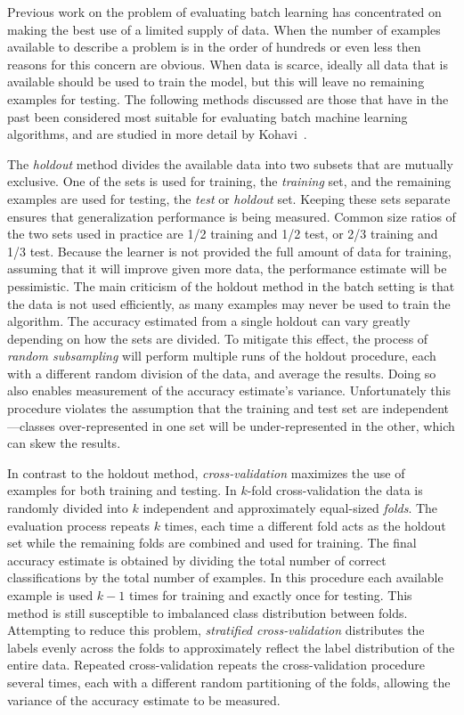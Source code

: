 Previous work on the problem of evaluating batch learning has concentrated on making the best use of a limited supply of data.
When the number of examples available to describe a problem is in the order of hundreds or even less then reasons for this concern are obvious. When data is scarce, ideally all data that is available should be used to train the model, but this will leave no remaining examples for testing. The following methods discussed are those that have in the past been considered most suitable for evaluating batch machine learning algorithms, and are studied in more detail by Kohavi~\cite{cvstudy}.


The {\em holdout} method divides the available data into two subsets that are mutually exclusive. One of the sets is used for training, the {\em training} set, and the remaining examples are used for testing, the {\em test} or {\em holdout} set. Keeping these sets separate ensures that generalization performance is being measured. Common size ratios of the two sets used in practice are 1/2 training and 1/2 test, or 2/3 training and 1/3 test. Because the learner is not provided the full amount of data for training, assuming that it will improve given more data, the performance estimate will be pessimistic. The main criticism of the holdout method in the batch setting is that the data is not used efficiently, as many examples may never be used to train the algorithm. The accuracy estimated from a single holdout can vary greatly depending on how the sets are divided. To mitigate this effect, the process of {\em random subsampling} will perform multiple runs of the holdout procedure, each with a different random division of the data, and average the results. Doing so also enables measurement of the accuracy estimate's variance. Unfortunately this procedure violates the assumption that the training and test set are independent---classes over-represented in one set will be under-represented in the other, which can skew the results. 


In contrast to the holdout method, {\em cross-validation} maximizes the use of examples for both training and testing. In $k$-fold cross-validation the data is randomly divided into $k$ independent and approximately equal-sized {\em folds}. The evaluation process repeats $k$ times, each time a different fold acts as the holdout set while the remaining folds are combined and used for training. The final accuracy estimate is obtained by dividing the total number of correct classifications by the total number of examples. In this procedure each available example is used $k-1$ times for training and exactly once for testing. This method is still susceptible to imbalanced class distribution between folds. Attempting to reduce this problem, {\em stratified cross-validation} distributes the labels evenly across the folds to approximately reflect the label distribution of the entire data. Repeated cross-validation repeats the cross-validation procedure several times, each with a different random partitioning of the folds, allowing the variance of the accuracy estimate to be measured.

